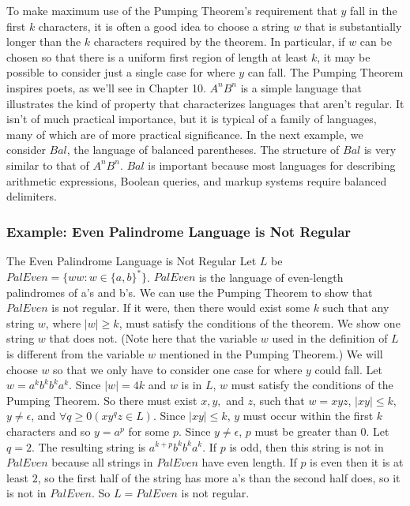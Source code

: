 \documentclass[hidelinks,12pt]{article}
\begin{document}
To make maximum use of the Pumping Theorem’s requirement that $y$ fall in the
first $k$ characters, it is often a good idea to choose a string $w$ that is
substantially longer than the $k$ characters required by the theorem. In
particular, if $w$ can be chosen so that there is a uniform first region of
length at least $k$, it may be possible to consider just a single case for
where $y$ can fall. The Pumping Theorem inspires poets, as we’ll see in Chapter
10. $A^nB^n$ is a simple language that illustrates the kind of property that
characterizes languages that aren’t regular. It isn’t of much practical
importance, but it is typical of a family of languages, many of which are of
more practical significance. In the next example, we consider $Bal$, the
language of balanced parentheses. The structure of $Bal$ is very similar to
that of $A^nB^n$. $Bal$ is important because most languages for describing
arithmetic expressions, Boolean queries, and markup systems require balanced
delimiters.

\subsubsection{Example: Even Palindrome Language is Not Regular}

The Even Palindrome Language is Not Regular Let $L$ be $PalEven = \{ww : w \in
\{a, b\}^*\}$. $PalEven$ is the language of even-length palindromes of a’s and
b’s. We can use the Pumping Theorem to show that $PalEven$ is not regular. If
it were, then there would exist some $k$ such that any string $w$, where $|w|
\geq k$, must satisfy the conditions of the theorem. We show one string $w$
that does not. (Note here that the variable $w$ used in the definition of $L$
is different from the variable $w$ mentioned in the Pumping Theorem.) We will
choose $w$ so that we only have to consider one case for where $y$ could fall.
Let $w = a^kb^kb^ka^k$. Since $|w| = 4k$ and $w$ is in $L$, $w$ must satisfy
the conditions of the Pumping Theorem. So there must exist $x, y,$ and $z$,
such that $w = xyz$, $|xy| \leq k$, $y \neq \epsilon$, and $\forall q \geq 0
(xy^qz \in L)$. Since $|xy| \leq k$, $y$ must occur within the first $k$
characters and so $y = a^p$ for some $p$. Since $y \neq \epsilon$, $p$ must be
greater than $0$. Let $q = 2$. The resulting string is $a^{k+p}b^kb^ka^k$. If
$p$ is odd, then this string is not in $PalEven$ because all strings in
$PalEven$ have even length. If $p$ is even then it is at least $2$, so the
first half of the string has more a’s than the second half does, so it is not
in $PalEven$. So $L = PalEven$ is not regular.
\end{document}
